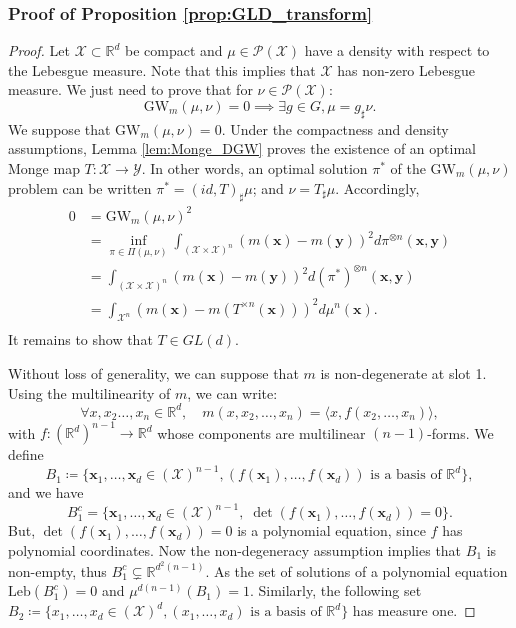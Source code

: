 \documentclass{article}
\newcommand{\R}{\mathbb{R}}
\newcommand{\Y}{\mathcal{Y}}
\newcommand{\X}{\mathcal{X}}
\newcommand{\1}{\mathbf{1}}
\newcommand{\GW}{\mathrm{GW}}
\newcommand{\Leb}{\mathrm{Leb}}
\renewcommand{\P}{\mathcal{P}}
\theoremstyle{definition}
\theoremstyle{remark}
\begin{document}
\begin{appendices}
\subsubsection*{Proof of Proposition \ref{prop:GLD_transform}}
\begin{proof}
    Let $\X\subset\R^d$ be compact and $\mu  \in \P(\X)$ have a density with respect to the Lebesgue measure. Note that this implies that $\X$ has non-zero Lebesgue measure. We just need to prove that for $\nu\in \P(\X)$: \[  \GW_{m}(\mu,\nu)= 0 \implies \exists g\in G, \mu = g_\sharp\nu.\]
    We suppose that $\GW_{m}(\mu,\nu)= 0$. Under the compactness and density assumptions, Lemma \ref{lem:Monge_DGW} proves the existence of an  optimal Monge map $T:\X\to\Y$. In other words, an optimal solution $\pi^*$ of the $\GW_{m}(\mu,\nu)$ problem can be written $\pi^*=(id,T)_\sharp\mu$; and $\nu =T_{\sharp} \mu$. Accordingly,
    \begin{equation*}
        \begin{split}
             0&=\GW_{m}(\mu,\nu)^2\\
             &=\inf_{\pi\in\Pi(\mu,\nu)}\int_{(\X\times\X)^n}(m(\mathbf{x})-m(\mathbf{y}))^2d\pi^{\otimes n}(\mathbf{x},\mathbf{y}) \\
             &=\int_{(\X\times\X)^n}(m(\mathbf{x})-m(\mathbf{y}))^2d(\pi^*)^{\otimes n}(\mathbf{x},\mathbf{y}) \\
             &=\int_{\X^n}(m(\mathbf{x})-m(T^{\times n}(\mathbf{x})))^2d\mu^{n}(\mathbf{x}). \\
        \end{split}
    \end{equation*}
    It remains to show that $T\in GL(d)$. 
    
    Without loss of generality, we can suppose that $m$ is non-degenerate at slot 1.
    Using the multilinearity of $m$, we can write:
    \[\forall x, x_2\dots,x_n\in \R^d,\quad m(x, x_2,\dots,x_n) = \langle x, f(x_2,\dots,x_n)\rangle,\]
    with $f:(\R^d)^{n-1}\to\R^d$ whose components are  multilinear $(n-1)$-forms. We define \[B_1\coloneqq \{\mathbf{x}_1,\dots,\mathbf{x}_{d} \in (\X)^{n-1}, (f(\mathbf{x}_1),\dots,f(\mathbf{x}_d))\text{ is a basis of }\R^d\} ,\] and we have  \[B_1^c  =  \{\mathbf{x}_1,\dots,\mathbf{x}_{d} \in (\X)^{n-1}, \;\det(f(\mathbf{x}_1),\dots,f(\mathbf{x}_d))=0\}.\] But, $\det(f(\mathbf{x}_1),\dots,f(\mathbf{x}_d))=0$ is a polynomial equation, since $f$ has polynomial coordinates. Now the non-degeneracy assumption implies that $B_1$ is non-empty, thus $B_1^c\subsetneq \R^{d^2(n-1)}$. As the set of solutions of a polynomial equation $\Leb(B_1^c)=0$ and $\mu^{d(n-1)}(B_1)=1$. Similarly, the following set $B_2\coloneqq \{x_1,\dots,x_{d} \in (\X)^{d}, (x_1,\dots,x_{d})\text{ is a basis of }\R^d\} $ has measure one. 
    

\end{proof}
\end{appendices}
\end{document}
